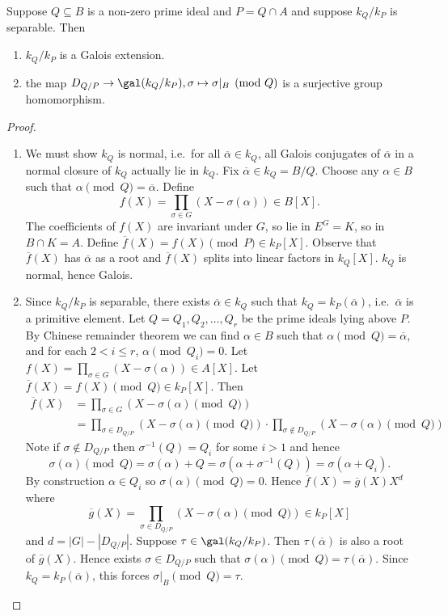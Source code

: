 \documentclass[a4paper]{article}
\begin{document}
\begin{proposition}
  Suppose \(Q \subseteq B\) is a non-zero prime ideal and \(P = Q \cap A\) and suppose \(k_Q/k_P\) is separable. Then
  \begin{enumerate}
  \item \(k_Q/k_P\) is a Galois extension.
  \item the map \(D_{Q/P} \to \gal(k_Q/k_P), \sigma \mapsto \sigma|_B \pmod Q\) is a surjective group homomorphism.
  \end{enumerate}
\end{proposition}

\begin{proof}\leavevmode
  \begin{enumerate}
  \item We must show \(k_Q\) is normal, i.e.\ for all \(\overline \alpha \in k_Q\), all Galois conjugates of \(\overline \alpha\) in a normal closure of \(k_Q\) actually lie in \(k_Q\). Fix \(\overline \alpha \in k_Q = B/Q\). Choose any \(\alpha \in B\) such that \(\alpha \pmod Q = \overline \alpha\). Define
    \[
      f(X) = \prod_{\sigma \in G} (X - \sigma(\alpha)) \in B[X].
    \]
    The coefficients of \(f(X)\) are invariant under \(G\), so lie in \(E^G = K\), so in \(B \cap K = A\). Define \(\overline f(X) = f(X) \pmod P \in k_P[X]\). Observe that \(\overline f(X)\) has \(\overline \alpha\) as a root and \(\overline f(X)\) splits into linear factors in \(k_Q[X]\). \(k_Q\) is normal, hence Galois.
  \item Since \(k_Q/k_P\) is separable, there exists \(\overline \alpha \in k_Q\) such that \(k_Q = k_P(\overline \alpha)\), i.e.\ \(\overline \alpha\) is a primitive element. Let \(Q = Q_1, Q_2, \dots, Q_r\) be the prime ideals lying above \(P\). By Chinese remainder theorem we can find \(\alpha \in B\) such that \(\alpha \pmod Q = \overline \alpha\), and for each \(2 < i \leq r\), \(\alpha \pmod{Q_i} = 0\). Let \(f(X) = \prod_{\sigma \in G}(X - \sigma(\alpha)) \in A[X]\). Let \(\overline f(X) = f(X) \pmod Q \in k_P[X]\). Then
    \begin{align*}
      \overline f(X)
      &= \prod_{\sigma \in G} (X - \sigma(\alpha) \pmod Q) \\
      &= \prod_{\sigma \in D_{Q/P}} (X - \sigma (\alpha) \pmod Q)
      \cdot \prod_{\sigma \notin D_{Q/P}} (X - \sigma (\alpha) \pmod Q)
    \end{align*}
    Note if \(\sigma \notin D_{Q/P}\) then \(\sigma^{-1}(Q) = Q_i\) for some \(i > 1\) and hence
    \[
      \sigma(\alpha) \pmod Q = \sigma(\alpha) + Q= \sigma(\alpha + \sigma^{-1}(Q)) = \sigma(\alpha + Q_i).
    \]
    By construction \(\alpha \in Q_i\) so \(\sigma(\alpha) \pmod Q = 0\). Hence \(\overline f(X) = \overline g(X) X^d\) where
    \[
      \overline g(X) = \prod_{\sigma \in D_{Q/P}} (X - \sigma(\alpha) \pmod Q) \in k_P[X]
    \]
    and \(d = |G| - |D_{Q/P}|\). Suppose \(\tau \in \gal(k_Q/k_P)\). Then \(\tau(\overline \alpha)\) is also a root of \(\overline g(X)\). Hence exists \(\sigma \in D_{Q/P}\) such that \(\sigma(\alpha) \pmod Q = \tau(\overline \alpha)\). Since \(k_Q = k_P(\overline \alpha)\), this forces \(\sigma|_B \pmod Q = \tau\).
  \end{enumerate}
\end{proof}
\end{document}
